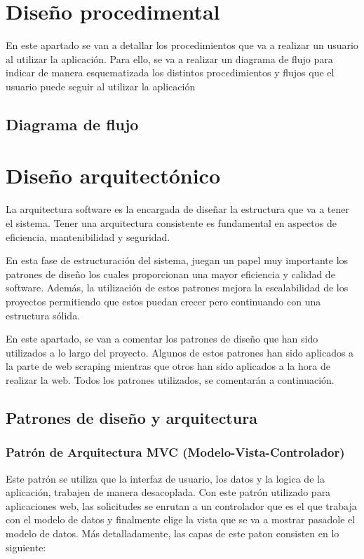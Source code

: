 
\section{Diseño procedimental}

En este apartado se van a detallar los procedimientos que va a realizar un usuario al utilizar la aplicación. Para ello, se va a realizar un diagrama de flujo para indicar de manera esquematizada los distintos procedimientos y flujos que el usuario puede seguir al utilizar la aplicación 

\newpage
\begin{landscape}
\subsection{Diagrama de flujo}
\end{landscape}
\newpage

\section{Diseño arquitectónico}
La arquitectura software es la encargada de diseñar la estructura que va a tener el sistema. Tener una arquitectura consistente es fundamental en aspectos de eficiencia, mantenibilidad y seguridad.

En esta fase de estructuración del sistema, juegan un papel muy importante los patrones de diseño los cuales proporcionan una mayor eficiencia y calidad de software.
Además, la utilización de estos patrones mejora la escalabilidad de los proyectos permitiendo que estos puedan crecer pero continuando con una estructura sólida.

En este apartado, se van a comentar los patrones de diseño que han sido utilizados a lo largo del proyecto. Algunos de estos patrones han sido aplicados a la parte de web scraping mientras que otros han sido aplicados a la hora de realizar la web. Todos los patrones utilizados, se comentarán a continuación.


\subsection{Patrones de diseño y arquitectura}

\subsubsection{Patrón de Arquitectura MVC (Modelo-Vista-Controlador)}
Este patrón se utiliza que la interfaz de usuario, los datos y la logica de la aplicación, trabajen de manera desacoplada. Con este patrón utilizado para aplicaciones web, las solicitudes se enrutan a un controlador que es el que trabaja con el modelo de datos y finalmente elige la vista que se va a mostrar pasadole el modelo de datos. Más detalladamente, las capas de este paton consisten en lo siguiente:

